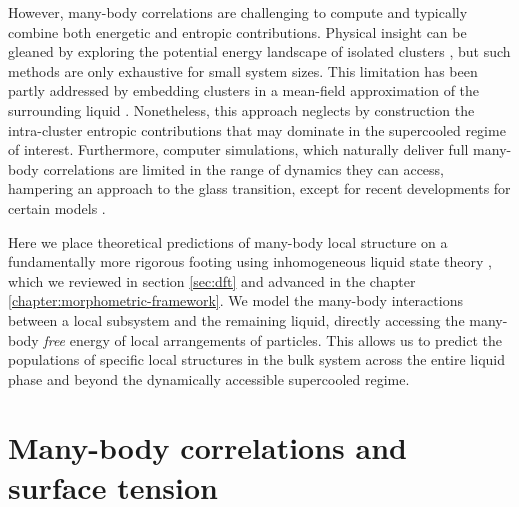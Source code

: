 \documentclass[11pt,twoside]{report}
\begin{document}
However, many-body correlations are challenging to compute and typically combine both energetic and entropic contributions.
Physical insight can be gleaned by exploring the potential energy landscape of isolated clusters \cite{Wales2004,ArkusPRL2009}, but such methods are only exhaustive for small system sizes.
This limitation has been partly addressed by embedding clusters in a mean-field approximation of the surrounding liquid \cite{MossaJCP2003,MossaJNS2006}.
Nonetheless, this approach neglects by construction the intra-cluster entropic contributions that may dominate in the supercooled regime of interest.
Furthermore, computer simulations, which naturally deliver full many-body correlations are limited in the range of dynamics they can access, hampering an approach to the glass transition, except for recent developments for certain models \cite{BerthierPRL2016}.

Here we place theoretical predictions of many-body local structure on a fundamentally more rigorous footing using inhomogeneous liquid state theory \cite{EvansAP1979}, which we reviewed in section \ref{sec:dft} and advanced in the chapter \ref{chapter:morphometric-framework}.
We model the many-body interactions between a local subsystem and the remaining liquid, directly accessing the many-body \textit{free} energy of local arrangements of particles.
This allows us to predict the populations of specific local structures in the bulk system across the entire liquid phase and beyond the dynamically accessible supercooled regime.

\section{Many-body correlations and surface tension}
\end{document}
